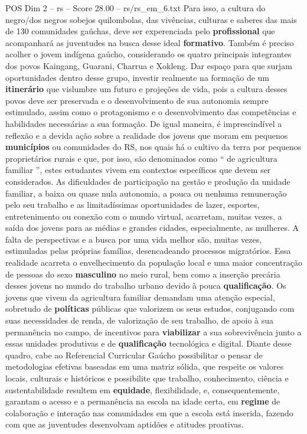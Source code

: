 \begin{textsample}{POS Dim 2 – rs – Score 28.00 – rs/rs\_em\_6.txt}
Para isso, a cultura do negro/dos negros sobejos quilombolas, das vivências, culturas e saberes das mais de 130 comunidades gaúchas, deve ser experenciada pelo \textbf{profissional} que acompanhará as juventudes na busca desse ideal \textbf{formativo}.
Também é preciso acolher o jovem indígena gaúcho, considerando os quatro principais integrantes dos povos Kaingang, Guarani, Charrua e Xokleng.
Dar espaço para que surjam oportunidades dentro desse grupo, investir realmente na formação de um \textbf{itinerário} que vislumbre um futuro e projeções de vida, pois a cultura desses povos deve ser preservada e o desenvolvimento de sua autonomia sempre estimulado, assim como o protagonismo e o desenvolvimento das competências e habilidades necessárias a sua formação.
De igual maneira, é imprescindível a reflexão e a devida ação sobre a realidade dos jovens que moram em pequenos \textbf{municípios} ou comunidades do RS, nos quais há o cultivo da terra por pequenos proprietários rurais e que, por isso, são denominados como “ de agricultura familiar ”, estes estudantes vivem em contextos específicos que devem ser considerados.
As dificuldades de participação na gestão e produção da unidade familiar, a baixa ou quase nula autonomia, a pouca ou nenhuma remuneração pelo seu trabalho e as limitadíssimas oportunidades de lazer, esportes, entretenimento ou conexão com o mundo virtual, acarretam, muitas vezes, a saída dos jovens para as médias e grandes cidades, especialmente, as mulheres.
A falta de perspectivas e a busca por uma vida melhor são, muitas vezes, estimuladas pelas próprias famílias, desencadeando processos migratórios.
Essa realidade acarreta o envelhecimento da população local e uma maior concentração de pessoas do sexo \textbf{masculino} no meio rural, bem como a inserção precária desses jovens no mundo do trabalho urbano devido à pouca \textbf{qualificação}.
Os jovens que vivem da agricultura familiar demandam uma atenção especial, sobretudo de \textbf{políticas} públicas que valorizem os seus estudos, conjugando com suas necessidades de renda, de valorização de seu trabalho, de apoio à sua permanência no campo, de incentivos para \textbf{viabilizar} a sua sobrevivência junto a essas unidades produtivas e de \textbf{qualificação} tecnológica e digital.
Diante desse quadro, cabe ao Referencial Curricular Gaúcho possibilitar o pensar de metodologias efetivas baseadas em uma matriz sólida, que respeite os valores locais, culturais e históricos e possibilite que trabalho, conhecimento, ciência e sustentabilidade resultem em \textbf{equidade}, flexibilidade, e, consequentemente, garantam o acesso e a permanência na escola na idade certa, em \textbf{regime} de colaboração e interação nas comunidades em que a escola está inserida, fazendo com que as juventudes desenvolvam aptidões e atitudes proativas.

\end{textsample}

